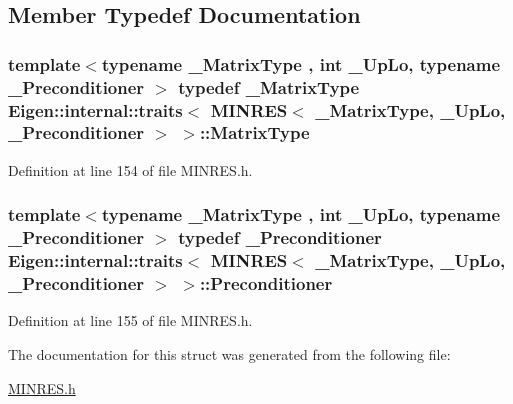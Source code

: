 \subsection{Member Typedef Documentation}
\hypertarget{struct_eigen_1_1internal_1_1traits_3_01_m_i_n_r_e_s_3_01___matrix_type_00_01___up_lo_00_01___preconditioner_01_4_01_4_a3691fee920b886dd88c999822c6e9e5c}{}
\subsubsection[{Matrix\+Type}]{\setlength{\rightskip}{0pt plus 5cm}template$<$typename \+\_\+\+Matrix\+Type , int \+\_\+\+Up\+Lo, typename \+\_\+\+Preconditioner $>$ typedef \+\_\+\+Matrix\+Type Eigen\+::internal\+::traits$<$ {\bf M\+I\+N\+R\+E\+S}$<$ \+\_\+\+Matrix\+Type, \+\_\+\+Up\+Lo, \+\_\+\+Preconditioner $>$ $>$\+::{\bf Matrix\+Type}}\label{struct_eigen_1_1internal_1_1traits_3_01_m_i_n_r_e_s_3_01___matrix_type_00_01___up_lo_00_01___preconditioner_01_4_01_4_a3691fee920b886dd88c999822c6e9e5c}


Definition at line 154 of file M\+I\+N\+R\+E\+S.\+h.

\hypertarget{struct_eigen_1_1internal_1_1traits_3_01_m_i_n_r_e_s_3_01___matrix_type_00_01___up_lo_00_01___preconditioner_01_4_01_4_a3f3f17b775bea08e709a72ed320f9e91}{}
\subsubsection[{Preconditioner}]{\setlength{\rightskip}{0pt plus 5cm}template$<$typename \+\_\+\+Matrix\+Type , int \+\_\+\+Up\+Lo, typename \+\_\+\+Preconditioner $>$ typedef \+\_\+\+Preconditioner Eigen\+::internal\+::traits$<$ {\bf M\+I\+N\+R\+E\+S}$<$ \+\_\+\+Matrix\+Type, \+\_\+\+Up\+Lo, \+\_\+\+Preconditioner $>$ $>$\+::{\bf Preconditioner}}\label{struct_eigen_1_1internal_1_1traits_3_01_m_i_n_r_e_s_3_01___matrix_type_00_01___up_lo_00_01___preconditioner_01_4_01_4_a3f3f17b775bea08e709a72ed320f9e91}


Definition at line 155 of file M\+I\+N\+R\+E\+S.\+h.



The documentation for this struct was generated from the following file\+:\begin{DoxyCompactItemize}
\item 
\hyperlink{_m_i_n_r_e_s_8h}{M\+I\+N\+R\+E\+S.\+h}\end{DoxyCompactItemize}
